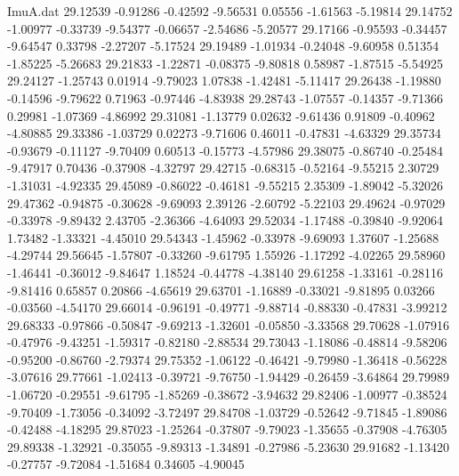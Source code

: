 \begin{filecontents}{ImuA.dat}
  29.12539   -0.91286   -0.42592   -9.56531    0.05556   -1.61563   -5.19814
  29.14752   -1.00977   -0.33739   -9.54377   -0.06657   -2.54686   -5.20577
  29.17166   -0.95593   -0.34457   -9.64547    0.33798   -2.27207   -5.17524
  29.19489   -1.01934   -0.24048   -9.60958    0.51354   -1.85225   -5.26683
  29.21833   -1.22871   -0.08375   -9.80818    0.58987   -1.87515   -5.54925
  29.24127   -1.25743    0.01914   -9.79023    1.07838   -1.42481   -5.11417
  29.26438   -1.19880   -0.14596   -9.79622    0.71963   -0.97446   -4.83938
  29.28743   -1.07557   -0.14357   -9.71366    0.29981   -1.07369   -4.86992
  29.31081   -1.13779    0.02632   -9.61436    0.91809   -0.40962   -4.80885
  29.33386   -1.03729    0.02273   -9.71606    0.46011   -0.47831   -4.63329
  29.35734   -0.93679   -0.11127   -9.70409    0.60513   -0.15773   -4.57986
  29.38075   -0.86740   -0.25484   -9.47917    0.70436   -0.37908   -4.32797
  29.42715   -0.68315   -0.52164   -9.55215    2.30729   -1.31031   -4.92335
  29.45089   -0.86022   -0.46181   -9.55215    2.35309   -1.89042   -5.32026
  29.47362   -0.94875   -0.30628   -9.69093    2.39126   -2.60792   -5.22103
  29.49624   -0.97029   -0.33978   -9.89432    2.43705   -2.36366   -4.64093
  29.52034   -1.17488   -0.39840   -9.92064    1.73482   -1.33321   -4.45010
  29.54343   -1.45962   -0.33978   -9.69093    1.37607   -1.25688   -4.29744
  29.56645   -1.57807   -0.33260   -9.61795    1.55926   -1.17292   -4.02265
  29.58960   -1.46441   -0.36012   -9.84647    1.18524   -0.44778   -4.38140
  29.61258   -1.33161   -0.28116   -9.81416    0.65857    0.20866   -4.65619
  29.63701   -1.16889   -0.33021   -9.81895    0.03266   -0.03560   -4.54170
  29.66014   -0.96191   -0.49771   -9.88714   -0.88330   -0.47831   -3.99212
  29.68333   -0.97866   -0.50847   -9.69213   -1.32601   -0.05850   -3.33568
  29.70628   -1.07916   -0.47976   -9.43251   -1.59317   -0.82180   -2.88534
  29.73043   -1.18086   -0.48814   -9.58206   -0.95200   -0.86760   -2.79374
  29.75352   -1.06122   -0.46421   -9.79980   -1.36418   -0.56228   -3.07616
  29.77661   -1.02413   -0.39721   -9.76750   -1.94429   -0.26459   -3.64864
  29.79989   -1.06720   -0.29551   -9.61795   -1.85269   -0.38672   -3.94632
  29.82406   -1.00977   -0.38524   -9.70409   -1.73056   -0.34092   -3.72497
  29.84708   -1.03729   -0.52642   -9.71845   -1.89086   -0.42488   -4.18295
  29.87023   -1.25264   -0.37807   -9.79023   -1.35655   -0.37908   -4.76305
  29.89338   -1.32921   -0.35055   -9.89313   -1.34891   -0.27986   -5.23630
  29.91682   -1.13420   -0.27757   -9.72084   -1.51684    0.34605   -4.90045

\end{filecontents}
